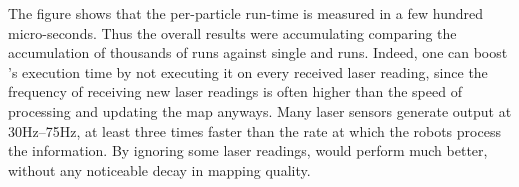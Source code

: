 The figure shows that the per-particle run-time is measured in a few hundred micro-seconds.
Thus the overall results were accumulating comparing the accumulation of thousands
of \FFD runs against single \WFD and \SOTA runs.  Indeed, one can boost \FFD's execution time by not executing it on 
every received laser reading, since the frequency of receiving new laser readings is often 
higher than the speed of processing and updating the map anyways.  Many laser sensors
generate output at 30Hz--75Hz, at least three times faster than the rate at which the robots
process the information.  By ignoring some laser readings, \FFD would perform much better, without
any noticeable decay in mapping quality.





